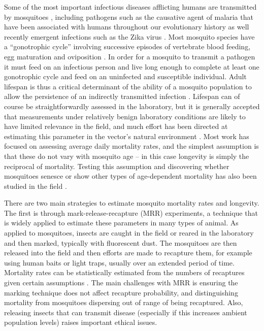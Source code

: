 \documentclass[]{article}
\begin{document}
Some of the most important infectious diseases afflicting humans are
transmitted by mosquitoes \citep{gates2014}, including pathogens such as the causative
agent of malaria that have been associated with humans throughout our
evolutionary history \citep{carter2002evolutionary} as well recently emergent infections such as the
Zika virus \citep{world2016statement}. Most mosquito species have a ``gonotrophic cycle'' involving
successive episodes of vertebrate blood feeding, egg maturation and
oviposition \citep{silver2007mosquito}. In order for a mosquito to transmit a pathogen it must feed
on an infectious person and live long enough to complete at least one
gonotrophic cycle and feed on an uninfected and susceptible individual.
Adult lifespan is thus a critical determinant of the ability of a
mosquito population to allow the persistence of an indirectly
transmitted infection \citep{macdonald1957epidemiology}. Lifespan can of course be straightforwardly
assessed in the laboratory, but it is generally accepted that
measurements under relatively benign laboratory conditions are likely to
have limited relevance in the field, and much effort has been directed
at estimating this parameter in the vector's natural environment \citep{clements1981analysis,guerra2014global}. Most
work has focused on assessing average daily mortality rates, and the
simplest assumption is that these do not vary with mosquito age -- in
this case longevity is simply the reciprocal of mortality. Testing this
assumption and discovering whether mosquitoes senesce or show other
types of age-dependent mortality has also been studied in the field \citep{clements1981analysis,harrington2008age,hugo2014adult}.

There are two main strategies to estimate mosquito mortality rates and
longevity. The first is through mark-release-recapture (MRR)
experiments, a technique that is widely applied to estimate these
parameters in many types of animal. As applied to mosquitoes, insects
are caught in the field or reared in the laboratory and then marked,
typically with fluorescent dust. The mosquitoes are then released into
the field and then efforts are made to recapture them, for example using
human baits or light traps, usually over an extended period of time.
Mortality rates can be statistically estimated from the numbers of
recaptures given certain assumptions \citep{silver2007mosquito}. The main challenges with MRR is
ensuring the marking technique does not affect recapture probability,
and distinguishing mortality from mosquitoes dispersing out of range of
being recaptured. Also, releasing insects that can transmit disease
(especially if this increases ambient population levels) raises
important ethical issues.
\end{document}
